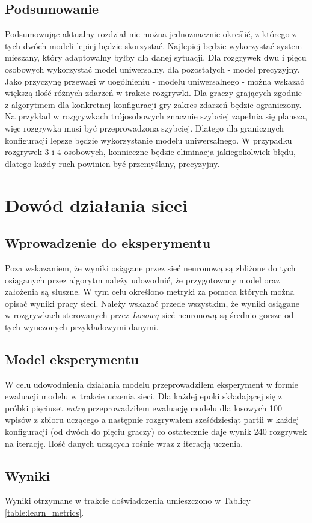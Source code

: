 \documentclass[12pt, oneside]{report}
\begin{document}
\section{Podsumowanie}
Podsumowując aktualny rozdział nie można jednoznacznie określić, z którego z tych dwóch modeli lepiej będzie skorzystać. Najlepiej będzie wykorzystać system mieszany, który adaptowalny byłby dla danej sytuacji. Dla rozgrywek dwu i pięcu osobowych wykorzystać model uniwersalny, dla pozostałych - model precyzyjny. Jako przyczynę przewagi w uogólnieniu - modelu uniwersalnego - można wskazać większą ilość różnych zdarzeń w trakcie rozgrywki. Dla graczy grających zgodnie z algorytmem dla konkretnej konfiguracji gry zakres  zdarzeń będzie ograniczony. Na przykład w rozgrywkach trójosobowych znacznie szybciej zapełnia się plansza, więc rozgrywka musi być przeprowadzona szybciej. Dlatego dla granicznych konfiguracji lepsze będzie wykorzystanie modelu uniwersalnego. W przypadku rozgrywek 3 i 4 osobowych, konnieczne będzie eliminacja jakiegokolwiek błędu, dlatego każdy ruch powinien być przemyślany, precyzyjny. 
\chapter{Dowód działania sieci}
\section{Wprowadzenie do eksperymentu}
Poza wskazaniem, że wyniki osiągane przez sieć neuronową są zbliżone do tych osiąganych przez algorytm należy udowodnić, że przygotowany model oraz założenia są słuszne. W tym celu określono metryki za pomoca których można opisać wyniki pracy sieci. Należy wskazać przede wszystkim, że wyniki osiągane w rozgrywkach sterowanych przez \textit{Losową} sieć neuronową są średnio gorsze od tych wyuczonych przykładowymi danymi.
\section{Model eksperymentu}
W celu udowodnienia działania modelu przeprowadziłem eksperyment w formie ewaluacji modelu w trakcie uczenia sieci. Dla każdej epoki składającej się z próbki pięciuset \textit{entry} przeprowadziłem ewaluację modelu dla losowych 100 wpisów z zbioru uczącego a następnie rozgrywałem sześćdziesiąt partii w każdej konfiguracji (od dwóch do pięciu graczy) co ostatecznie daje wynik 240 rozgrywek na iterację. Ilość danych uczących rośnie wraz z iteracją uczenia.
\section{Wyniki}
Wyniki otrzymane w trakcie doświadczenia umieszczono w Tablicy \ref{table:learn_metrics}.
\end{document}
